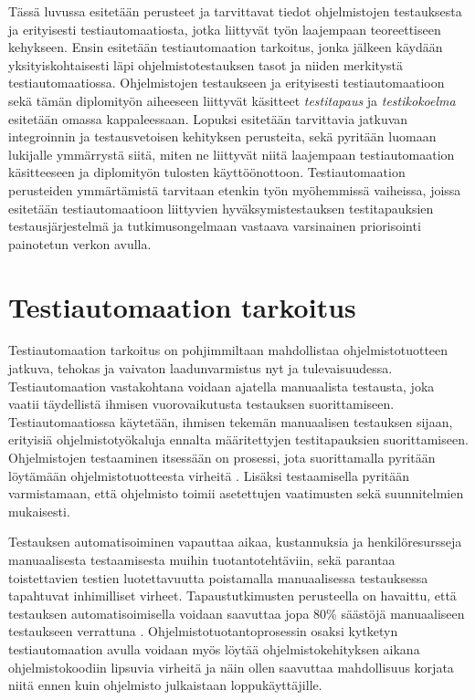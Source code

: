 Tässä luvussa esitetään perusteet ja tarvittavat tiedot ohjelmistojen testauksesta ja erityisesti testiautomaatiosta, jotka liittyvät työn laajempaan teoreettiseen kehykseen.
Ensin esitetään testiautomaation tarkoitus, jonka jälkeen käydään yksityiskohtaisesti läpi ohjelmistotestauksen tasot ja niiden merkitystä testiautomaatiossa.
Ohjelmistojen testaukseen ja erityisesti testiautomaatioon sekä tämän diplomityön aiheeseen liittyvät käsitteet \emph{testitapaus} ja \emph{testikokoelma} esitetään omassa kappaleessaan.
Lopuksi esitetään tarvittavia jatkuvan integroinnin ja testausvetoisen kehityksen perusteita, sekä pyritään luomaan lukijalle ymmärrystä siitä, miten ne liittyvät niitä laajempaan testiautomaation käsitteeseen ja diplomityön tulosten käyttöönottoon.
Testiautomaation perusteiden ymmärtämistä tarvitaan etenkin työn myöhemmissä vaiheissa, joissa esitetään testiautomaatioon liittyvien hyväksymistestauksen testitapauksien testausjärjestelmä ja tutkimusongelmaan vastaava varsinainen priorisointi painotetun verkon avulla.

\section{Testiautomaation tarkoitus} \label{ch:07_testiautomaation_tarkoitus}

  Testiautomaation tarkoitus on pohjimmiltaan mahdollistaa ohjelmistotuotteen jatkuva, tehokas ja vaivaton laadunvarmistus nyt ja tulevaisuudessa.
  Testiautomaation vastakohtana voidaan ajatella manuaalista testausta, joka vaatii täydellistä ihmisen vuorovaikutusta testauksen suorittamiseen.
  Testiautomaatiossa käytetään, ihmisen tekemän manuaalisen testauksen sijaan, erityisiä ohjelmistotyökaluja ennalta määritettyjen testitapauksien suorittamiseen.
  Ohjelmistojen testaaminen itsessään on prosessi, jota suorittamalla pyritään löytämään ohjelmistotuotteesta virheitä  \cite[s.~11]{the_art_of_software_testing_book}.
  Lisäksi testaamisella pyritään varmistamaan, että ohjelmisto toimii asetettujen vaatimusten sekä suunnitelmien mukaisesti.

  Testauksen automatisoiminen vapauttaa aikaa, kustannuksia ja henkilöresursseja manuaalisesta testaamisesta muihin tuotantotehtäviin, sekä parantaa toistettavien testien luotettavuutta poistamalla manuaalisessa testauksessa tapahtuvat inhimilliset virheet.
  Tapaustutkimusten perusteella on havaittu, että testauksen automatisoimisella voidaan saavuttaa jopa 80\% säästöjä manuaaliseen testaukseen verrattuna \cite[s.~3]{software_test_automation_book}.
  Ohjelmistotuotantoprosessin osaksi kytketyn testiautomaation avulla voidaan myös löytää ohjelmistokehityksen aikana ohjelmistokoodiin lipsuvia virheitä ja näin ollen saavuttaa mahdollisuus korjata niitä ennen kuin ohjelmisto julkaistaan loppukäyttäjille.

